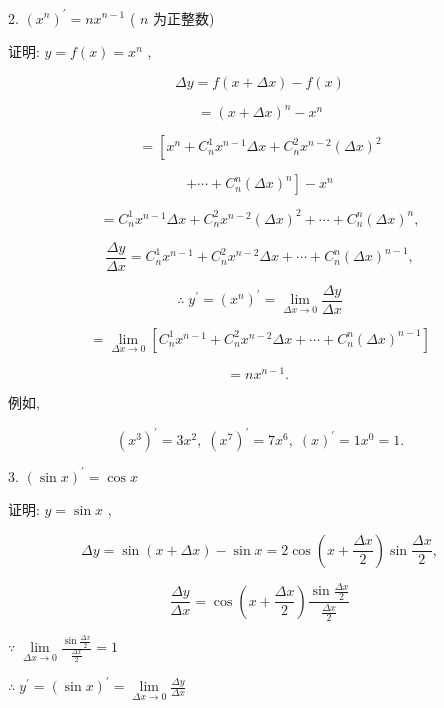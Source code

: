 \documentclass[lang=cn,newtx,10pt,scheme=chinese]{elegantbook}
\begin{document}
2. \({\left( {x}^{n}\right) }^{\prime } = n{x}^{n - 1}\) ( \(n\) 为正整数)

证明: \(y = f\left( x\right) = {x}^{n}\) ,

\[
{\Delta y} = f\left( {x + {\Delta x}}\right) - f\left( x\right)
\]

\[
= {\left( x + \Delta x\right) }^{n} - {x}^{n}
\]

\[
= \left\lbrack {{x}^{n} + {C}_{n}^{1}{x}^{n - 1}{\Delta x} + {C}_{n}^{2}{x}^{n - 2}{\left( \Delta x\right) }^{2}}\right.
\]

\[
\left. {+\cdots + {C}_{n}^{n}{\left( \Delta x\right) }^{n}}\right\rbrack - {x}^{n}
\]

\[
= {C}_{n}^{1}{x}^{n - 1}{\Delta x} + {C}_{n}^{2}{x}^{n - 2}{\left( \Delta x\right) }^{2} + \cdots + {C}_{n}^{n}{\left( \Delta x\right) }^{n},
\]

\[
\frac{\Delta y}{\Delta x} = {C}_{n}^{1}{x}^{n - 1} + {C}_{n}^{2}{x}^{n - 2}{\Delta x} + \cdots + {C}_{n}^{n}{\left( \Delta x\right) }^{n - 1},
\]

\[
\therefore \;{y}^{\prime } = {\left( {x}^{n}\right) }^{\prime } = \mathop{\lim }\limits_{{{\Delta x} \rightarrow 0}}\frac{\Delta y}{\Delta x}
\]

\[
= \mathop{\lim }\limits_{{{\Delta x} \rightarrow 0}}\left\lbrack {{C}_{n}^{1}{x}^{n - 1} + {C}_{n}^{2}{x}^{n - 2}{\Delta x} + \cdots + {C}_{n}^{n}{\left( \Delta x\right) }^{n - 1}}\right\rbrack
\]

\[
= n{x}^{n - 1}\text{. }
\]

例如,

\[
{\left( {x}^{3}\right) }^{\prime } = 3{x}^{2},\;{\left( {x}^{7}\right) }^{\prime } = 7{x}^{6},\;{\left( x\right) }^{\prime } = 1{x}^{0} = 1.
\]

3. \({\left( \sin x\right) }^{\prime } = \cos x\)

证明: \(y = \sin x\) ,

\[
{\Delta y} = \sin \left( {x + {\Delta x}}\right) - \sin x = 2\cos \left( {x + \frac{\Delta x}{2}}\right) \sin \frac{\Delta x}{2},
\]

\[
\frac{\Delta y}{\Delta x} = \cos \left( {x + \frac{\Delta x}{2}}\right) \frac{\sin \frac{\Delta x}{2}}{\frac{\Delta x}{2}}
\]

\(\because \;\mathop{\lim }\limits_{{{\Delta x} \rightarrow 0}}\frac{\sin \frac{\Delta x}{2}}{\frac{\Delta x}{2}} = 1\)

\(\therefore \;{y}^{\prime } = {\left( \sin x\right) }^{\prime } = \mathop{\lim }\limits_{{{\Delta x} \rightarrow 0}}\frac{\Delta y}{\Delta x}\)
\end{document}
